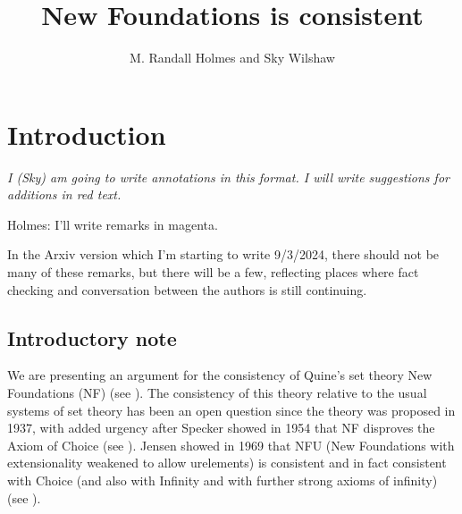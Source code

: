 \documentclass[112pt]{article}
\title{New Foundations is consistent}
\author{M. Randall Holmes and Sky Wilshaw}
\theoremstyle{definition}
\theoremstyle{remark}
\newcommand{\suggest}[1]{{\color{red} #1}}
\newcommand{\hsuggest}[1]{{\color{magenta}#1}}
\newenvironment{annot}{\begin{center}\color{blue}\sl}{\end{center}}
\begin{document}
\maketitle

\tableofcontents

\newpage


\newpage

\section{Introduction}

\begin{annot}
  I (Sky) am going to write annotations in this format.
  I will write suggestions for additions in \suggest{red text}.
\end{annot}

\hsuggest{Holmes: I'll write remarks in magenta.}

\hsuggest{In the Arxiv version which I'm starting to write 9/3/2024, there should not be many of these remarks, but there will be a few, reflecting places where fact checking and conversation between the authors is still continuing.}

\subsection{Introductory note}

We are presenting an argument for the consistency of Quine's set theory New Foundations (NF) (see \cite{nf}).  The consistency of this theory relative to the usual systems of set theory has been an open question since the theory was proposed in 1937, with added urgency after Specker showed in 1954 that NF disproves the Axiom of Choice (see \cite{notac}).
Jensen showed in 1969 that NFU (New Foundations with extensionality weakened to allow urelements) is consistent and in fact consistent with Choice (and also with Infinity and with further strong axioms of infinity) (see \cite{nfu}).
\end{document}
